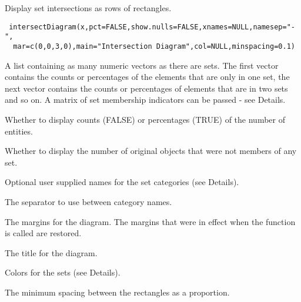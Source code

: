 \begin{Description}\relax
Display set intersections as rows of rectangles.
\end{Description}
\begin{Usage}
\begin{verbatim}
 intersectDiagram(x,pct=FALSE,show.nulls=FALSE,xnames=NULL,namesep="-",
  mar=c(0,0,3,0),main="Intersection Diagram",col=NULL,minspacing=0.1)
\end{verbatim}
\end{Usage}
\begin{Arguments}
\begin{ldescription}
\item[\code{x}] A list containing as many numeric vectors as there are sets. The
first vector contains the counts or percentages of the elements that are
only in one set, the next vector contains the counts or percentages of 
elements that are in two sets and so on. A matrix of set membership
indicators can be passed - see Details.
\item[\code{pct}] Whether to display counts (FALSE) or percentages (TRUE) of the
number of entities.
\item[\code{show.nulls}] Whether to display the number of original objects that were
not members of any set.
\item[\code{xnames}] Optional user supplied names for the set categories (see
Details).
\item[\code{namesep}] The separator to use between category names.
\item[\code{mar}] The margins for the diagram. The margins that were in effect when
the function is called are restored.
\item[\code{main}] The title for the diagram.
\item[\code{col}] Colors for the sets (see Details).
\item[\code{minspacing}] The minimum spacing between the rectangles as a proportion.
\end{ldescription}
\end{Arguments}
